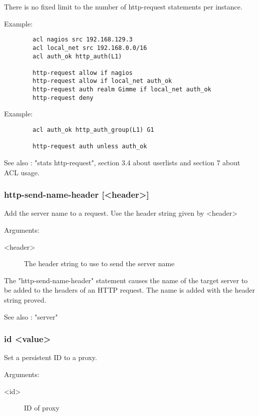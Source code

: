   There is no fixed limit to the number of http-request statements per
  instance.

  Example:
  \begin{verbatim}
        acl nagios src 192.168.129.3
        acl local_net src 192.168.0.0/16
        acl auth_ok http_auth(L1)

        http-request allow if nagios
        http-request allow if local_net auth_ok
        http-request auth realm Gimme if local_net auth_ok
        http-request deny
    \end{verbatim}

  Example:
\begin{verbatim}
        acl auth_ok http_auth_group(L1) G1

        http-request auth unless auth_ok
\end{verbatim}

  See also : "stats http-request", section 3.4 about userlists and section 7
             about ACL usage.

\subsubsection[http-send-name-header]{http-send-name-header [<header>]}
  Add the server name to a request. Use the header string given by <header>


  Arguments:
  
\begin{description}
\item[ <header>]  The header string to use to send the server name
\end{description}

  The "http-send-name-header" statement causes the name of the target
  server to be added to the headers of an HTTP request.  The name
  is added with the header string proved.

  See also : "server"

\subsubsection[id]{id <value>}
  Set a persistent ID to a proxy.
  
  
  Arguments:
\begin{description}
\item[<id>] ID of proxy 
\end{description}


